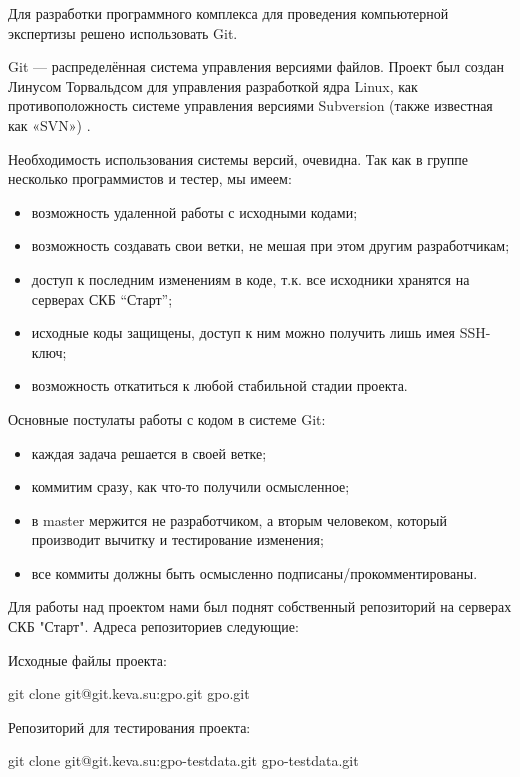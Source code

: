 Для разработки программного комплекса для проведения компьютерной экспертизы решено использовать Git.

Git  — распределённая система управления версиями файлов. Проект был создан Линусом Торвальдсом для управления разработкой ядра Linux,  как противоположность  системе управления версиями Subversion (также известная как «SVN») \cite{progit}.

Необходимость использования системы версий, очевидна. Так как в группе несколько программистов и тестер, мы имеем:
\begin{itemize}
\item возможность удаленной работы с исходными кодами;
\item возможность создавать свои ветки, не мешая при этом другим разработчикам;
\item доступ к последним изменениям в коде, т.к. все исходники хранятся на серверах СКБ “Старт”;
\item исходные коды защищены, доступ к ним можно получить лишь имея SSH-ключ;
\item возможность откатиться к любой стабильной стадии проекта.
\end{itemize}

Основные постулаты работы с кодом в системе Git:

\begin{itemize}
\item каждая задача решается в своей ветке;
\item коммитим сразу, как что-то получили осмысленное;
\item в master мержится не разработчиком, а вторым человеком, который производит вычитку и тестирование изменения;
\item все коммиты должны быть осмысленно подписаны/прокомментированы.
\end{itemize}

Для работы над проектом нами был поднят собственный репозиторий на серверах СКБ "Старт".
Адреса репозиториев следующие:

Исходные файлы проекта:

git clone git@git.keva.su:gpo.git gpo.git

Репозиторий для тестирования проекта:

git clone git@git.keva.su:gpo-testdata.git gpo-testdata.git
